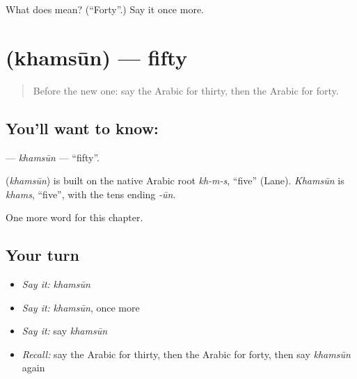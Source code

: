 \begin{tcolorbox}[breakable,colback=teal!4,colframe=teal!35!black,title={Before you move on}]
What does  mean? (\textquotedblleft{}Forty\textquotedblright{}.) Say it once more.
\end{tcolorbox}
\section[\texorpdfstring{\ar{خمسون} (khamsūn)}{خمسون (khamsūn)}]{ (khamsūn) — fifty}

\label{lesson:AR-C97-khamsun}



\begin{quote}
Before the new one: say the Arabic for thirty, then the Arabic for forty.
\end{quote}

\subsection*{You'll want to know: }
\textbf{} — \emph{khamsūn} — \textquotedblleft{}fifty\textquotedblright{}.

\begin{cousinweb}
\textbf{} (\emph{khamsūn}) is built on the native Arabic root \emph{kh-m-s}, \textquotedblleft{}five\textquotedblright{} (Lane). \emph{Khamsūn} is \emph{khams}, \textquotedblleft{}five\textquotedblright{}, with the tens ending \emph{-ūn}.
\end{cousinweb}

\begin{grammarlens}[title={What you've built}]
One more word for this chapter.
\end{grammarlens}

\subsection*{Your turn}
\begin{itemize}
\raggedright
  \item \emph{Say it:} \emph{khamsūn}
  \item \emph{Say it:} \emph{khamsūn}, once more
  \item \emph{Say it:} say \emph{khamsūn}
  \item \emph{Recall:} say the Arabic for thirty, then the Arabic for forty, then say \emph{khamsūn} again
\end{itemize}

